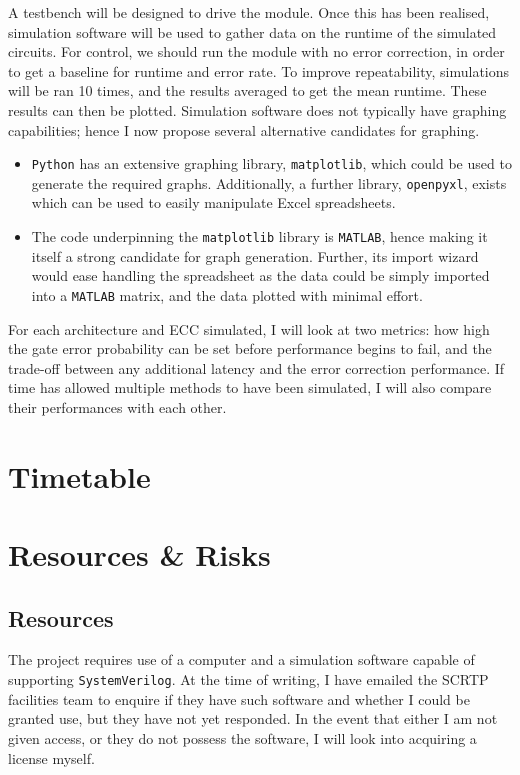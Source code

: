 \documentclass[12pt,a4paper]{article}
\begin{document}
\noindent A testbench will be designed to drive the module. Once this has been realised, simulation software will be 
used to gather data on the runtime of the simulated circuits. For control, we should run the module with no error 
correction, in order to get a baseline for runtime and error rate. To improve repeatability, simulations will be ran 
10 times, and the results averaged to get the mean runtime. These results can then be plotted. Simulation software 
does not typically have graphing capabilities; hence I now propose several alternative candidates for graphing.
\begin{itemize}
    \item \texttt{Python} has an extensive graphing library, \texttt{matplotlib}, which could be used to generate 
    the required graphs. Additionally, a further library, \texttt{openpyxl}, exists which can be used to easily 
    manipulate Excel spreadsheets. 
    \item The code underpinning the \texttt{matplotlib} library is \texttt{MATLAB}, hence making it itself a strong 
    candidate for graph generation. Further, its import wizard would ease handling the spreadsheet as the data could 
    be simply imported into a \texttt{MATLAB} matrix, and the data plotted with minimal effort.
\end{itemize}

\noindent For each architecture and ECC simulated, I will look at two metrics: how high the gate error probability 
can be set before performance begins to fail, and the trade-off between any additional latency and the error 
correction performance. If time has allowed multiple methods to have been simulated, I will also compare their 
performances with each other.


\section{Timetable}



\section{Resources \& Risks}
\subsection{Resources}
The project requires use of a computer and a simulation software capable of supporting \texttt{SystemVerilog}. At 
the time of writing, I have emailed the SCRTP facilities team to enquire if they have such software and whether I 
could be granted use, but they have not yet responded. In the event that either I am not given access, or they do 
not possess the software, I will look into acquiring a license myself.
\end{document}
